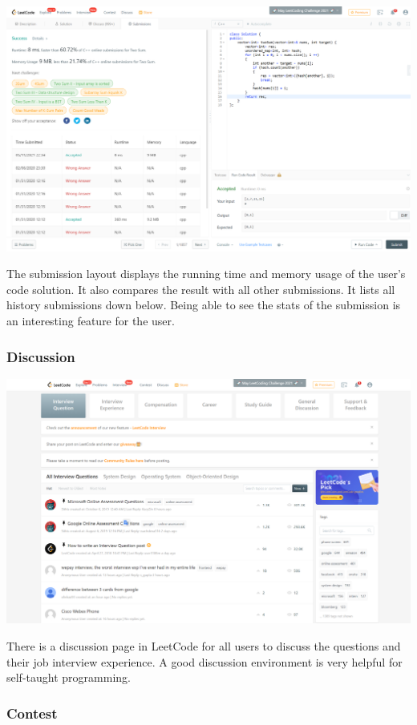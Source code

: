 \documentclass{report}
\begin{document}
\includegraphics[width=\linewidth]{Two-Sum-LeetCode-Submission}

The submission layout displays the running time and memory usage of the user's code solution. It also compares the result with all other submissions. It lists all history submissions down below. Being able to see the stats of the submission is an interesting feature for the user.

\subsubsection{Discussion}

\includegraphics[width=\linewidth]{nterview-Question-LeetCode-Discuss}

There is a discussion page in LeetCode for all users to discuss the questions and their job interview experience. A good discussion environment is very helpful for self-taught programming.

\subsubsection{Contest}
\end{document}
